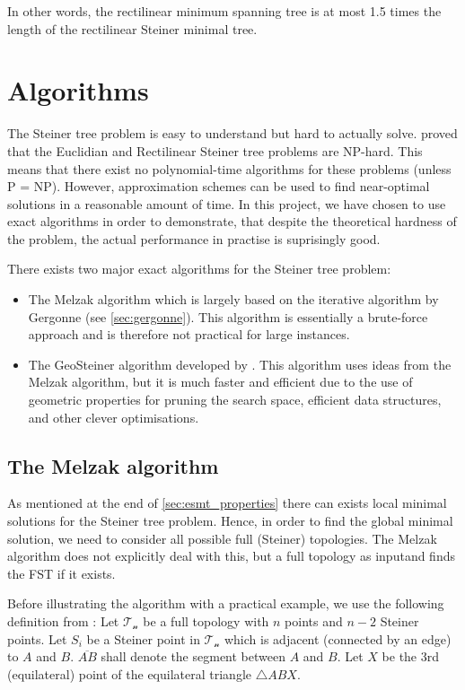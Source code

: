 \documentclass{l4proj}
\begin{document}
In other words, the rectilinear minimum spanning tree is at most 1.5 times the length of the rectilinear Steiner minimal tree.

\section{Algorithms}
\label{sec:algorithms}
The Steiner tree problem is easy to understand but hard to actually solve. \cite{Garey1977} proved that the Euclidian and Rectilinear Steiner tree problems are NP-hard. This means that there exist no polynomial-time algorithms for these problems (unless P = NP).
However, approximation schemes can be used to find near-optimal solutions in a reasonable amount of time. In this project, we have chosen to use exact algorithms in order to demonstrate, that despite the theoretical hardness of the problem, the actual performance in practise is suprisingly good.

There exists two major exact algorithms for the Steiner tree problem:
\begin{itemize}
    \item The Melzak algorithm \cite{MelzakAlgo} which is largely based on the iterative algorithm by Gergonne \citep{Brazil2014} (see \ref{sec:gergonne}). This algorithm is essentially a brute-force approach and is therefore not practical for large instances.
    \item The GeoSteiner algorithm developed by \cite{geosteiner96}. This algorithm uses ideas from the Melzak algorithm, but it is much faster and efficient due to the use of geometric properties for pruning the search space, efficient data structures, and other clever optimisations.
\end{itemize}
\subsection{The Melzak algorithm}
\label{sec:melzak_algo}
As mentioned at the end of \ref{sec:esmt_properties} there can exists local minimal solutions for the Steiner tree problem. Hence, in order to find the global minimal solution, we need to consider all possible full (Steiner) topologies. The Melzak algorithm does not explicitly deal with this, but a full topology as inputand finds the FST if it exists.

Before illustrating the algorithm with a practical example, we use the following definition from \citep{Brazil2015}:
Let $\mathcal{T_n}$ be a full topology with $n$ points and $n - 2$ Steiner points. Let $S_i$ be a Steiner point in $\mathcal{T_n}$ which is adjacent (connected by an edge) to $A$ and $B$. $\overline{AB}$ shall denote the segment between $A$ and $B$. Let $X$ be the 3rd (equilateral) point of the equilateral triangle $\triangle ABX$.
\end{document}
